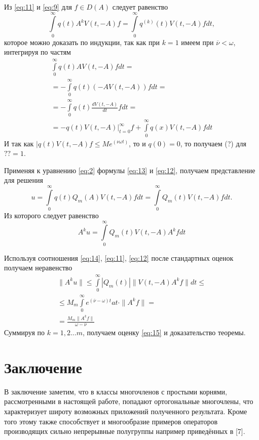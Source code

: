 \documentclass[1244sdpt,a4paper]{article}
\theoremstyle{plain}
\numberwithin{equation}{section}
\begin{document}
Из \ref{eq:11} и \ref{eq:9} для $f \in D(A)$ следует равенство
\begin{equation}
    \label{eq:12}
    \int\limits_0^\infty q(t) A^k V(t, -A)f = \int\limits_0^\infty q^{(k)}(t) V(t, -A)fdt,
\end{equation}
которое можно доказать по индукции, так как при $k=1$ имеем при $\overline{\nu} < \omega$, интегрируя по частям
\begin{gather*}
    \int\limits_0^\infty q(t) A V(t, -A)fdt = \\
    = -\int\limits_0^\infty q(t) (-A V(t, -A))fdt = \\
    = -\int\limits_0^\infty q(t) \frac{dV(t, -A)}{dt}fdt = \\
    = -q(t) V(t, -A)\bigg|_{t=0}^{\infty}f + \int\limits_0^\infty q(x) V(t, -A)fdt
\end{gather*}
И так как $|q(t) V(t, -A)f \le Me^{(\nu \omega t)}$, то и $q(0)=0$, то получаем (?) для $?? = 1$.

Применяя к уравнению \ref{eq:2} формулы \ref{eq:13} и \ref{eq:12}, получаем представление для решения
\begin{equation}
    u = \int\limits_0^\infty q(t) Q_m(A) V(t, -A)fdt = \int\limits_0^\infty Q_m (t) V(t, -A)fdt.
\end{equation}
Из которого следует равенство
\begin{equation}
    A^k u = \int\limits_0^\infty Q_m (t) V(t, -A) A^k fdt
\end{equation}

Используя соотношения \ref{eq:14}, \ref{eq:11}, \ref{eq:12} после стандартных оценок получаем неравенство
\begin{gather*}
    \|A^k u\| \le \int\limits_0^\infty |Q_m (t)| \|V(t, -A) A^k f\| dt \le \\
    \le M_m \int\limits_0^\infty e^{(\overline{\nu} - \omega)t} at \cdot \|A^k f\| = \\
    = \frac{M_m \|A^k f\|}{\omega - \overline{\nu}}
\end{gather*}
Суммируя по $k = 1, 2 ... m$, получаем оценку \ref{eq:15} и доказательство теоремы.

\section{Заключение}

В заключение заметим, что в классы многочленов с простыми корнями, рассмотренными в настоящей работе,
попадают ортогональные многочлены, что характеризует широту возможных приложений полученного результата.
Кроме того этому также способствует и многообразие примеров операторов производящих сильно непрерывные
полугруппы например приведённых в [7].

\clearpage

\begin{thebibliography}{99}
\end{thebibliography}
\end{document}
